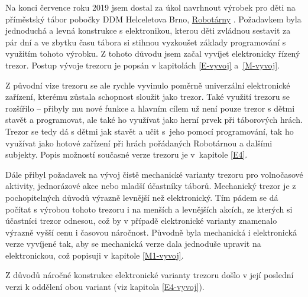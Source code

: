 Na konci července roku 2019 jsem dostal za úkol navrhnout výrobek pro děti na příměstský tábor pobočky DDM Helceletova Brno, \href{https://helceletka.cz/robotarna/}{Robotárny} \parencite{robotarna}.
Poža\-dav\-kem byla jednoduchá a levná konstrukce s elektronikou, kterou děti zvládnou sestavit za pár dní a ve zbytku času tábora si stihnou vyzkoušet základy programování 
s využitím tohoto výrobku. Z tohoto důvodu jsem začal vyvíjet elektronicky řízený trezor. Postup vývoje trezoru je popsán v kapitolách \ref{E-vyvoj} a~\ref{M-vyvoj}.

Z původní vize trezoru se ale rychle vyvinulo poměrně univerzální elektronické zařízení, kterému zůstala schopnost sloužit jako trezor.
Také využití trezoru se rozšířilo -- přibyly mu nové funkce a hlavním cílem už není pouze trezor  s dětmi stavět a programovat, 
ale také ho využívat jako herní prvek při táborových hrách. 
Trezor se tedy dá s dětmi jak stavět a učit s~jeho pomocí programování, tak ho využívat jako hotové zařízení při hrách pořádaných Robotárnou a dalšími subjekty.
Popis možností současné verze trezoru je v~kapitole \ref{E4}.

Dále přibyl požadavek na vývoj čistě mechanické varianty trezoru pro volnočasové aktivity, jednorázové akce nebo mladší účastníky táborů.
Mechanický trezor je z pochopitelných důvodů výrazně levnější než elektronický. Tím pádem se dá počítat s výrobou tohoto trezoru i na menších a levnějších akcích, ze kterých 
si účastníci trezor odnesou, což by v případě elektronické varianty znamenalo výrazně vyšší cenu i časovou náročnost.
Původně byla mechanická i elektronická verze vyvíjené tak, aby se mechanická verze dala jednoduše upravit na elektronickou, což popisuji v kapitole \ref{M1-vyvoj}.

Z důvodů náročné konstrukce elektronické varianty trezoru došlo v její poslední verzi k oddělení obou variant (viz kapitola \ref{E4-vyvoj}).



